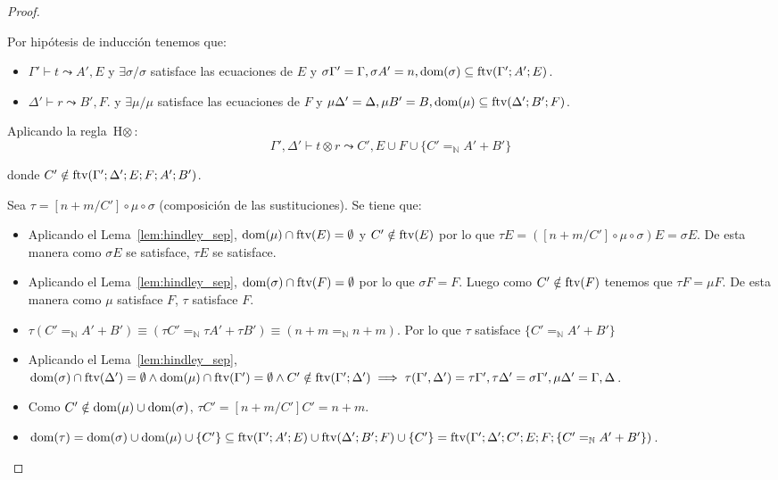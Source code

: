 \begin{proof}
\begin{itemize}
Por hipótesis de inducción tenemos que:
\begin{itemize}
    \item $\Gamma'\vdash t \leadsto A',E$ y $\exists \sigma / \sigma$ satisface las ecuaciones de $E$ y $\sigma \Gamma' = \Gamma, \sigma A'=n, \text{dom}(\sigma)\subseteq \text{ftv}(\Gamma';A';E)$.
    \item $\Delta'\vdash r \leadsto B',F$. y $\exists \mu / \mu$ satisface las ecuaciones de $F$ y $\mu \Delta' = \Delta, \mu B'= B, \text{dom}(\mu)\subseteq \text{ftv}(\Delta';B';F)$.
\end{itemize}

Aplicando la regla $\text{H}\otimes$:
\[\Gamma',\Delta' \vdash t\otimes r \leadsto C', E \cup F \cup \{C'=_\mathbb{N} A'+ B'\}\]

donde $C' \notin \text{ftv}(\Gamma';\Delta';E;F;A';B')$.

Sea $\tau = [n+m/C'] \circ \mu \circ \sigma$ (composición de las sustituciones). Se tiene que:
   
\begin{itemize}
    \item Aplicando el Lema~\ref{lem:hindley_sep}, $\text{dom}(\mu)\cap\text{ftv}(E)=\emptyset$ y $C'\notin \text{ftv}(E)$ por lo que \(
    \tau E = ([n+m/C'] \circ \mu\circ \sigma)E=\sigma E\). De esta manera como $\sigma E$ se satisface, $\tau E$ se satisface.
    \item Aplicando el Lema~\ref{lem:hindley_sep}, $\text{dom}(\sigma)\cap\text{ftv}(F)=\emptyset$ por lo que $\sigma F=F$. Luego como $C'\notin \text{ftv}(F)$ tenemos que $\tau F=\mu F$. De esta manera como $\mu$ satisface $F$, $\tau$ satisface $F$.
    \item $\tau (C' =_\mathbb{N} A'+ B') \equiv (\tau C' =_\mathbb{N} \tau A' + \tau B') \equiv (n+m =_\mathbb{N} n + m)$. Por lo que $\tau$ satisface $\{C' =_\mathbb{N} A'+ B'\}$
    \item Aplicando el Lema~\ref{lem:hindley_sep}, $\text{dom}(\sigma)\cap \text{ftv}(\Delta')=\emptyset  \wedge \text{dom}(\mu)\cap \text{ftv}(\Gamma')=\emptyset \wedge C'\notin \text{ftv}(\Gamma';\Delta') \implies \tau (\Gamma', \Delta') = \tau \Gamma', \tau \Delta' = \sigma \Gamma', \mu \Delta' = \Gamma, \Delta$.
    \item Como $C' \notin \text{dom}(\mu)\cup\text{dom}(\sigma)$, $\tau C' = [n+m/C']C' = n+m$.
    \item $ \text{dom}(\tau) = \text{dom}(\sigma)\cup\text{dom}(\mu)\cup\{C'\} \subseteq \text{ftv}(\Gamma';A';E)\cup\text{ftv}(\Delta';B';F)\cup\{C'\} =\text{ftv}(\Gamma';\Delta';C';E;F;\{C'=_\mathbb{N} A'+ B'\})$.
\end{itemize}


\end{itemize}
\end{proof}
